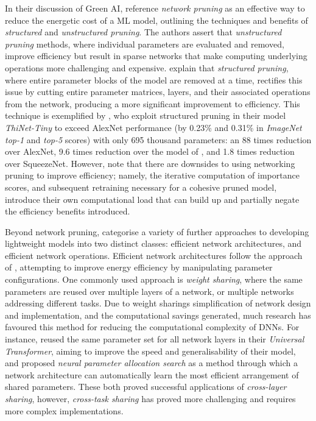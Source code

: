 \documentclass[a4paper, 12pt]{article}
\begin{document}
    In their discussion of Green AI,  reference \emph{network pruning} as an effective way to reduce the energetic cost of a ML model, outlining the techniques and benefits of \emph{structured} and \emph{unstructured pruning}. The authors assert that \emph{unstructured pruning} methods, where individual parameters are evaluated and removed, improve efficiency but result in sparse networks that make computing underlying operations more challenging and expensive.  explain that \emph{structured pruning}, where entire parameter blocks of the model are removed at a time, rectifies this issue by cutting entire parameter matrices, layers, and their associated operations from the network, producing a more significant improvement to efficiency. This technique is exemplified by , who exploit structured pruning in their model \emph{ThiNet-Tiny} to exceed AlexNet performance (by 0.23\% and 0.31\% in \emph{ImageNet top-1} and \emph{top-5} scores) with only 695 thousand parameters: an 88 times reduction over AlexNet, 9.6 times reduction over the model of , and 1.8 times reduction over SqueezeNet. However,  note that there are downsides to using networking pruning to improve efficiency; namely, the iterative computation of importance scores, and subsequent retraining necessary for a cohesive pruned model, introduce their own computational load that can build up and partially negate the efficiency benefits introduced.

    Beyond network pruning,  categorise a variety of further approaches to developing lightweight models into two distinct classes: efficient network architectures, and efficient network operations. Efficient network architectures follow the approach of , attempting to improve energy efficiency by manipulating parameter configurations. One commonly used approach is \emph{weight sharing}, where the same parameters are reused over multiple layers of a network, or multiple networks addressing different tasks. Due to weight sharings simplification of network design and implementation, and the computational savings generated, much research has favoured this method for reducing the computational complexity of DNNs. For instance,  reused the same parameter set for all network layers in their \emph{Universal Transformer}, aiming to improve the speed and generalisability of their model, and  proposed \emph{neural parameter allocation search} as a method through which a network architecture can automatically learn the most efficient arrangement of shared parameters. These both proved successful applications of \emph{cross-layer sharing}, however, \emph{cross-task sharing} has proved more challenging and requires more complex implementations. 
\end{document}

